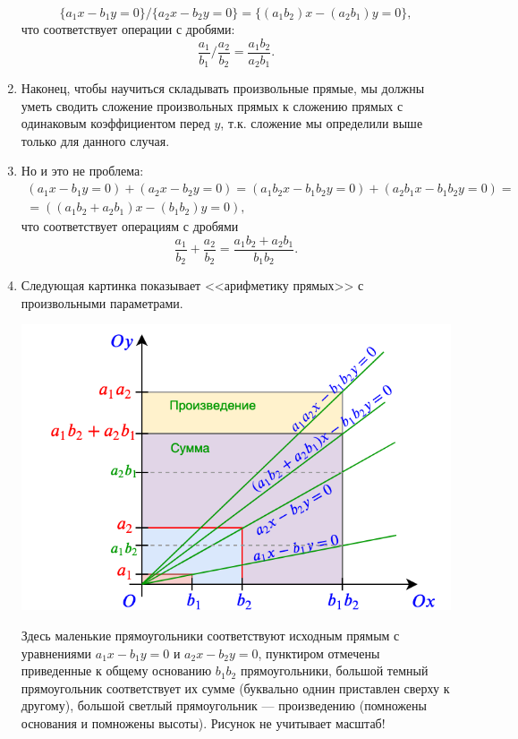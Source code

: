 \begin{enumerate}
$$
\{a_1x-b_1y=0\}/\{a_2x-b_2y=0\} = \{(a_1b_2)x-(a_2b_1)y=0\},
$$
что соответствует операции с дробями:
$$
\frac{a_1}{b_1}/\frac{a_2}{b_2} = \frac{a_1b_2}{a_2b_1}.
$$
\item Наконец, чтобы научиться складывать произвольные прямые, мы должны уметь сводить сложение произвольных прямых к сложению прямых с одинаковым коэффициентом перед $y$, т.к. сложение мы определили выше только для данного случая.
\item Но и это не проблема:
\begin{gather*}
(a_1x-b_1y=0)+(a_2x-b_2y=0) = (a_1b_2x-b_1b_2y=0) + (a_2b_1x-b_1b_2y=0) = \\
= ((a_1b_2+a_2b_1)x-(b_1b_2)y=0),
\end{gather*}
что соответствует операциям с дробями
$$
\frac{a_1}{b_2}+\frac{a_2}{b_2} = \frac{a_1b_2+a_2b_1}{b_1b_2}.
$$
\item Следующая картинка показывает <<арифметику прямых>> с произвольными параметрами.
\begin{center}
\includegraphics[scale=0.5]{linear.png}
\end{center}
Здесь маленькие прямоугольники соответствуют исходным прямым с уравнениями $a_1x-b_1y=0$ и $a_2x-b_2y=0$, пунктиром отмечены приведенные к общему основанию $b_1b_2$ прямоугольники, большой темный прямоугольник соответствует их сумме (буквально однин приставлен сверху к другому), большой светлый прямоугольник --- произведению (помножены основания и помножены высоты). Рисунок не учитывает масштаб!


\end{enumerate}
